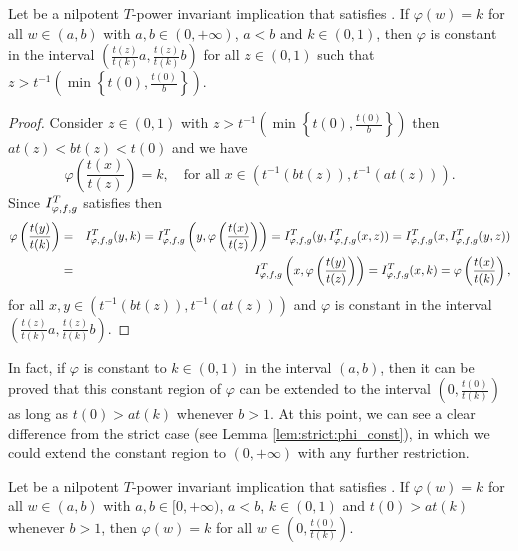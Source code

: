 \begin{lemma}\label{lem:nilpotent:(EP)ConstantIntervals}
	Let \IT be a nilpotent $T$-power invariant implication that satisfies \EP. If $\varphi(w)=k$ for all $w \in (a,b)$ with $a,b \in (0,+\infty)$, $a<b$ and $k \in (0,1)$, then $\varphi$ is constant in the interval $\left(\frac{t(z)}{t(k)}a,\frac{t(z)}{t(k)}b\right)$ for all $z \in (0,1)$ such that $z>t^{-1}\left(\min \left\{t(0),\frac{t(0)}{b}\right\}\right).$
\end{lemma}
\begin{proof}
	Consider $z \in (0,1)$ with $z > t^{-1}\left(\min\left\{t(0),\frac{t(0)}{b}\right\}\right)$ then $at(z) < bt(z) < t(0)$ and we have
	$$\varphi \left(\frac{t(x)}{t(z)}\right) =k, \quad \text{for  all } x \in (t^{-1}(bt(z)),t^{-1}(at(z))).$$
	Since $I^T_{\varphi,f,g}$ satisfies \EP then
	\begin{eqnarray*}
		\varphi\left(\frac{t(y)}{t(k)}\right) &=& I^T_{\varphi,f,g}(y,k) = I^T_{\varphi,f,g} \left(y,\varphi \left(\frac{t(x)}{t(z)}\right)\right) = I^T_{\varphi,f,g}(y,I^T_{\varphi,f,g}(x,z)) = I^T_{\varphi,f,g}(x,I^T_{\varphi,f,g}(y,z)) \\
		&=& I^T_{\varphi,f,g} \left(x,\varphi \left(\frac{t(y)}{t(z)}\right)\right) = I^T_{\varphi,f,g}(x,k) = \varphi \left(\frac{t(x)}{t(k)}\right),
	\end{eqnarray*}
	for all $x,y \in (t^{-1}(bt(z)),t^{-1}(at(z)))$ and $\varphi$ is constant in the interval $\left(\frac{t(z)}{t(k)}a,\frac{t(z)}{t(k)}b\right)$.
\end{proof}

In fact, if $\varphi$ is constant to $k \in (0,1)$ in the interval $(a,b)$, then it can be proved that this constant region of $\varphi$ can be extended to the interval $\left(0,\frac{t(0)}{t(k)}\right)$ as long as $t(0)>at(k)$ whenever $b>1$. At this point, we can see a clear difference from the strict case (see Lemma \ref{lem:strict:phi_const}), in which we could extend the constant region to $(0,+\infty)$ with any further restriction.
\begin{lemma}\label{lem:nilpotent:(EP)BigConstantZone}
	Let \IT be a nilpotent $T$-power invariant implication that satisfies \EP. If $\varphi(w)=k$ for all $w \in (a,b)$ with $a,b \in [0,+\infty)$, $a<b$, $k \in (0,1)$ and $t(0) > at(k)$ whenever $b>1$, then $\varphi(w)=k$ for all $w \in \left(0,\frac{t(0)}{t(k)}\right)$.
\end{lemma}

